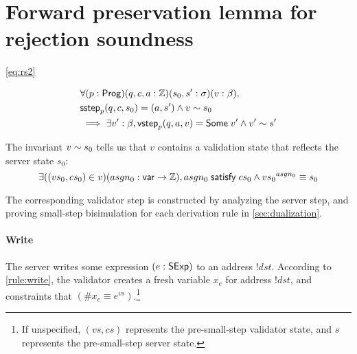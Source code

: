 \section{Forward preservation lemma for rejection soundness}
\label{sec:rs2-proof}
\autoref{eq:rs2}

\begin{align*}
  &\forall(p:\mathsf{Prog})(q,c,a:\mathbb Z)(s_0,s':\sigma)(v:\beta),\\
  &\mathsf{sstep}_p(q,c,s_0)=(a,s')\wedge v\sim s_0\\
  &\implies\exists v':\beta,\mathsf{vstep}_p(q,a,v)=\mathsf{Some}\;v'\wedge v'\sim s'
\end{align*}

The invariant $v\sim s_0$ tells us that $v$ contains a validation state
that reflects the server state $s_0$:
\[\exists((vs_0,cs_0)\in v)(asgn_0:\mathsf{var}\to\mathbb Z),asgn_0\;\mathsf{satisfy}\;cs_0\wedge {vs_0}^{asgn_0}\equiv s_0\]

The corresponding validator step is constructed by analyzing the server step,
and proving small-step bisimulation for each derivation rule
in \autoref{sec:dualization}.

\paragraph{Write}
The server writes some expression $(e:\mathsf{SExp})$ to an address $!dst$.
According to \autoref{rule:write}, the validator creates a fresh variable $x_e$
for address $!dst$, and constraints that $(\#x_e\equiv e^{vs})$.\footnote{If
unspecified, $(vs,cs)$ represents the pre-small-step validator state, and $s$
represents the pre-small-step server state.}

